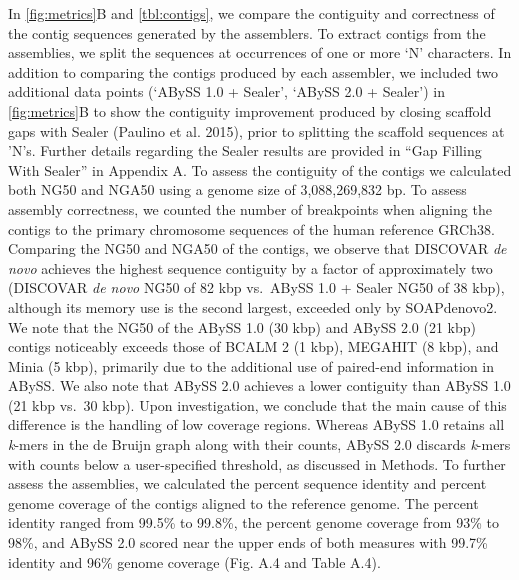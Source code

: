 \documentclass[
  12pt,
  oneside,
  openany]{book}
\begin{document}
In \cref{fig:metrics}B and \cref{tbl:contigs}, we compare the contiguity and correctness of the contig sequences generated by the assemblers. To extract contigs from the assemblies, we split the sequences at occurrences of one or more `N' characters. In addition to comparing the contigs produced by each assembler, we included two additional data points (`ABySS 1.0 + Sealer', `ABySS 2.0 + Sealer') in \cref{fig:metrics}B to show the contiguity improvement produced by closing scaffold gaps with Sealer (Paulino et al. 2015), prior to splitting the scaffold sequences at 'N's. Further details regarding the Sealer results are provided in ``Gap Filling With Sealer'' in Appendix A. To assess the contiguity of the contigs we calculated both NG50 and NGA50 using a genome size of 3,088,269,832 bp. To assess assembly correctness, we counted the number of breakpoints when aligning the contigs to the primary chromosome sequences of the human reference GRCh38. Comparing the NG50 and NGA50 of the contigs, we observe that DISCOVAR \emph{de novo} achieves the highest sequence contiguity by a factor of approximately two (DISCOVAR \emph{de novo} NG50 of 82 kbp vs.~ABySS 1.0 + Sealer NG50 of 38 kbp), although its memory use is the second largest, exceeded only by SOAPdenovo2. We note that the NG50 of the ABySS 1.0 (30 kbp) and ABySS 2.0 (21 kbp) contigs noticeably exceeds those of BCALM 2 (1 kbp), MEGAHIT (8 kbp), and Minia (5 kbp), primarily due to the additional use of paired-end information in ABySS. We also note that ABySS 2.0 achieves a lower contiguity than ABySS 1.0 (21 kbp vs.~30 kbp). Upon investigation, we conclude that the main cause of this difference is the handling of low coverage regions. Whereas ABySS 1.0 retains all \emph{k}-mers in the de Bruijn graph along with their counts, ABySS 2.0 discards \emph{k}-mers with counts below a user-specified threshold, as discussed in Methods. To further assess the assemblies, we calculated the percent sequence identity and percent genome coverage of the contigs aligned to the reference genome. The percent identity ranged from 99.5\% to 99.8\%, the percent genome coverage from 93\% to 98\%, and ABySS 2.0 scored near the upper ends of both measures with 99.7\% identity and 96\% genome coverage (Fig. A.4 and Table A.4).
\end{document}
